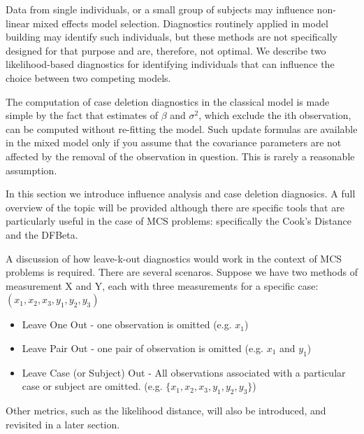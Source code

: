 \documentclass[12pt, a4paper]{report}
\theoremstyle{plain}
\theoremstyle{definition}
\theoremstyle{remark}
\begin{document}
Data from single individuals, or a small group of subjects may influence non-linear mixed effects model selection. Diagnostics routinely applied in model building may identify such individuals, but these methods are not specifically designed for that purpose and are, therefore, not optimal. We describe two likelihood-based diagnostics for identifying individuals that can influence the choice between two competing models.


The computation of case deletion diagnostics in the classical model is made simple by the fact that estimates of $\beta$ and $\sigma^2$, which exclude the ith observation, can be computed without re-fitting the model. Such update formulas are available in the mixed model only if you assume that the covariance parameters are not affected by the removal of the observation in question. This is rarely a reasonable assumption.

In this section we introduce influence analysis and case deletion diagnosics. A full overview of the topic will be provided although there are specific tools that are particularly useful in the case of MCS problems: specifically the Cook's Distance and the DFBeta.

A discussion of how leave-k-out diagnostics would work in the context of MCS problems is required. There are several scenaros. Suppose we have two methods of measurement X and Y, each with three measurements for a specific case: $(x_1,x_2,x_3,y_1,y_2,y_3)$

\begin{itemize}
	\item Leave One Out - one observation is omitted (e.g. $x_1$)
	\item Leave Pair Out - one pair of observation  is omitted (e.g. $x_1$ and $y_1$)
	\item Leave Case (or Subject) Out - All observations associated with a particular case or subject are omitted. (e.g. $\{x_1,x_2,x_3,y_1,y_2,y_3\}$)
\end{itemize}
Other metrics, such as the likelihood distance, will also be introduced, and revisited in a later section.

\end{document}
